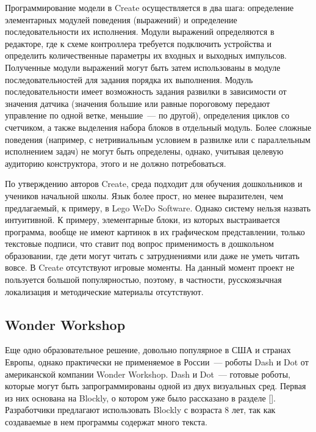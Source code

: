 \documentclass[a5paper]{article}
\begin{document}
Программирование модели в Create осуществляется в два шага: определение элементарных модулей поведения (выражений) 
и определение последовательности  их исполнения. Модули выражений определяются в редакторе, где к схеме контроллера 
требуется подключить устройства и определить количественные параметры их входных и выходных импульсов. Полученные 
модули выражений могут быть затем использованы в модуле последовательностей для задания порядка их выполнения. 
Модуль последовательности имеет возможность задания развилки в зависимости от значения датчика (значения большие 
или равные пороговому передают управление по одной ветке, меньшие~--- по другой), определения циклов со счетчиком, 
а также выделения набора блоков в отдельный модуль. Более сложные поведения (например, с нетривиальным условием в 
развилке или с параллельным исполнением задач) не могут быть определены, однако, учитывая целевую аудиторию 
конструктора, этого и не должно потребоваться.

По утверждению авторов Create, среда подходит для обучения дошкольников и учеников начальной школы. Язык более прост, 
но менее выразителен, чем предлагаемый, к примеру, в Lego WeDo Software. Однако систему нельзя назвать интуитивной. 
К примеру, элементарные блоки, из которых выстраивается программа, вообще не имеют картинок в их графическом 
представлении, только текстовые подписи, что ставит под вопрос применимость в дошкольном образовании, где дети могут 
читать с затруднениями или даже не уметь читать вовсе. В Create отсутствуют игровые моменты. На данный момент проект 
не пользуется большой популярностью, поэтому, в частности, русскоязычная локализация и методические материалы 
отсутствуют.

\subsection{Wonder Workshop}

Еще одно образовательное решение, довольно популярное в США и странах Европы, однако практически не применяемое в 
России~--- роботы Dash и Dot от американской компании Wonder Workshop. Dash и Dot~--- готовые роботы, которые 
могут быть запрограммированы одной из двух визуальных сред. Первая из них основана на Blockly, о котором уже 
было рассказано в разделе []. Разработчики предлагают использовать Blockly с возраста 8 лет, так как создаваемые 
в нем программы содержат много текста. 
\end{document}
